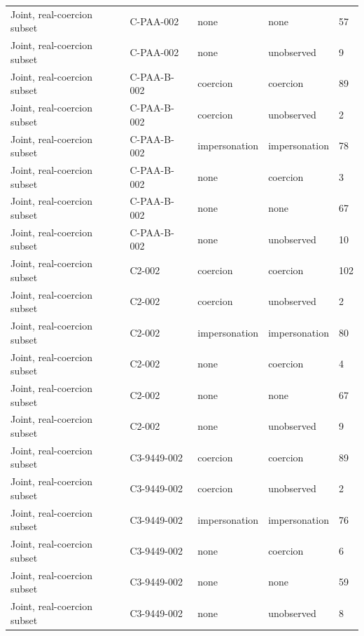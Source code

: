 \begin{tabular}{lllll}
Joint, real-coercion subset & C-PAA-002 & none & none & 57 \\
Joint, real-coercion subset & C-PAA-002 & none & unobserved & 9 \\
Joint, real-coercion subset & C-PAA-B-002 & coercion & coercion & 89 \\
Joint, real-coercion subset & C-PAA-B-002 & coercion & unobserved & 2 \\
Joint, real-coercion subset & C-PAA-B-002 & impersonation & impersonation & 78 \\
Joint, real-coercion subset & C-PAA-B-002 & none & coercion & 3 \\
Joint, real-coercion subset & C-PAA-B-002 & none & none & 67 \\
Joint, real-coercion subset & C-PAA-B-002 & none & unobserved & 10 \\
Joint, real-coercion subset & C2-002 & coercion & coercion & 102 \\
Joint, real-coercion subset & C2-002 & coercion & unobserved & 2 \\
Joint, real-coercion subset & C2-002 & impersonation & impersonation & 80 \\
Joint, real-coercion subset & C2-002 & none & coercion & 4 \\
Joint, real-coercion subset & C2-002 & none & none & 67 \\
Joint, real-coercion subset & C2-002 & none & unobserved & 9 \\
Joint, real-coercion subset & C3-9449-002 & coercion & coercion & 89 \\
Joint, real-coercion subset & C3-9449-002 & coercion & unobserved & 2 \\
Joint, real-coercion subset & C3-9449-002 & impersonation & impersonation & 76 \\
Joint, real-coercion subset & C3-9449-002 & none & coercion & 6 \\
Joint, real-coercion subset & C3-9449-002 & none & none & 59 \\
Joint, real-coercion subset & C3-9449-002 & none & unobserved & 8 \\
\hline
\end{tabular}
